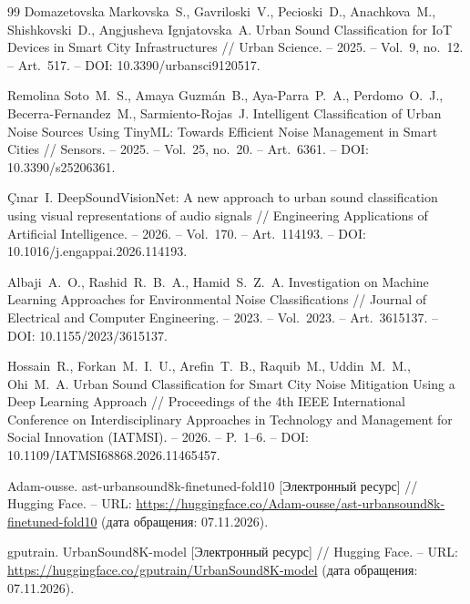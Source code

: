 \documentclass[pdflatex,sn-mathphys-num]{sn-jnl}
\begin{document}
\begin{thebibliography}{99}
Domazetovska Markovska~S., Gavriloski~V., Pecioski~D., Anachkova~M., Shishkovski~D., Angjusheva Ignjatovska~A. Urban Sound Classification for IoT Devices in Smart City Infrastructures // Urban Science. -- 2025. -- Vol.~9, no.~12. -- Art.~517. -- DOI: 10.3390/urbansci9120517.

Remolina Soto~M.~S., Amaya Guzm\'{a}n~B., Aya-Parra~P.~A., Perdomo~O.~J., Becerra-Fernandez~M., Sarmiento-Rojas~J. Intelligent Classification of Urban Noise Sources Using TinyML: Towards Efficient Noise Management in Smart Cities // Sensors. -- 2025. -- Vol.~25, no.~20. -- Art.~6361. -- DOI: 10.3390/s25206361.

\c{C}{\i}nar~I. DeepSoundVisionNet: A new approach to urban sound classification using visual representations of audio signals // Engineering Applications of Artificial Intelligence. -- 2026. -- Vol.~170. -- Art.~114193. -- DOI: 10.1016/j.engappai.2026.114193.

Albaji~A.~O., Rashid~R.~B.~A., Hamid~S.~Z.~A. Investigation on Machine Learning Approaches for Environmental Noise Classifications // Journal of Electrical and Computer Engineering. -- 2023. -- Vol.~2023. -- Art.~3615137. -- DOI: 10.1155/2023/3615137.

Hossain~R., Forkan~M.~I.~U., Arefin~T.~B., Raquib~M., Uddin~M.~M., Ohi~M.~A. Urban Sound Classification for Smart City Noise Mitigation Using a Deep Learning Approach // Proceedings of the 4th IEEE International Conference on Interdisciplinary Approaches in Technology and Management for Social Innovation (IATMSI). -- 2026. -- P.~1--6. -- DOI: 10.1109/IATMSI68868.2026.11465457.

Adam-ousse. ast-urbansound8k-finetuned-fold10 [Электронный ресурс] // Hugging Face. -- URL: \url{https://huggingface.co/Adam-ousse/ast-urbansound8k-finetuned-fold10} (дата обращения: 07.11.2026).

gputrain. UrbanSound8K-model [Электронный ресурс] // Hugging Face. -- URL: \url{https://huggingface.co/gputrain/UrbanSound8K-model} (дата обращения: 07.11.2026).

\end{thebibliography}
\end{document}
